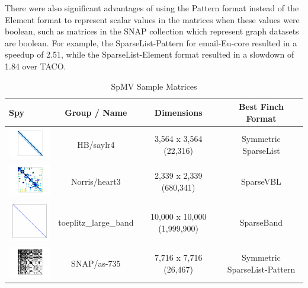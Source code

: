 There were also significant advantages of using the Pattern format instead of the Element format to represent scalar values in the matrices when these values were boolean, such as matrices in the SNAP collection which represent graph datasets are boolean. For example, the SparseList-Pattern for email-Eu-core resulted in a speedup of 2.51, while the SparseList-Element format resulted in a slowdown of 1.84 over TACO.

\begin{table}[htbp]
    \centering
    \caption{SpMV Sample Matrices}
    \label{spmv_sample_matrices}
    \begin{tabular}{|m{3cm}|c|c|c|}
        \hline
        \textbf{Spy} & \textbf{Group / Name} & \textbf{Dimensions} & \textbf{Best Finch Format}\\
        \hline
        \includegraphics[width=3cm]{spmv_matrices/saylr4.png} & HB/saylr4 & 3,564 x 3,564 (22,316) & Symmetric SparseList \\
        \hline 
        \includegraphics[width=3cm]{spmv_matrices/heart3.png} & Norris/heart3 & 2,339 x 2,339 (680,341) & SparseVBL \\
        \hline 
        \includegraphics[width=3cm]{spmv_matrices/toeplitz_large_band.png} & toeplitz\_large\_band  & 10,000 x 10,000 (1,999,900) & SparseBand \\
        \hline
        \includegraphics[width=3cm]{spmv_matrices/as-735.png} & SNAP/as-735 & 7,716 x 7,716 (26,467) & Symmetric SparseList-Pattern \\
        \hline
    \end{tabular}
\end{table}


